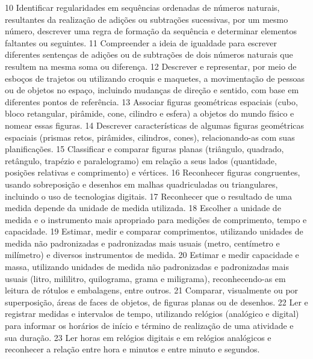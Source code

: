 {{{			}
			{10}{%
				Identificar regularidades em sequências ordenadas de números naturais,
				resultantes da realização de adições ou subtrações sucessivas, por um mesmo número,
				descrever uma regra de formação da sequência e determinar elementos faltantes ou seguintes.
			}
			{11}{%
				Compreender a ideia de igualdade para escrever diferentes sentenças de adições
				ou de subtrações de dois números naturais que resultem na mesma soma ou diferença.
			}
			{12}{%
				Descrever e representar, por meio de esboços de trajetos ou utilizando croquis
				e maquetes, a movimentação de pessoas ou de objetos no espaço, incluindo mudanças de
				direção e sentido, com base em diferentes pontos de referência.
			}
			{13}{%
				Associar figuras geométricas espaciais (cubo, bloco retangular, pirâmide, cone,
				cilindro e esfera) a objetos do mundo físico e nomear essas figuras.
			}
			{14}{%
				Descrever características de algumas figuras geométricas espaciais (prismas
				retos, pirâmides, cilindros, cones), relacionando-as com suas planificações.
			}
			{15}{%
				Classificar e comparar figuras planas (triângulo, quadrado, retângulo, trapézio
				e paralelogramo) em relação a seus lados (quantidade, posições relativas e comprimento) e
				vértices.
			}
			{16}{%
				Reconhecer figuras congruentes, usando sobreposição e desenhos em malhas
				quadriculadas ou triangulares, incluindo o uso de tecnologias digitais.
			}
			{17}{%
				Reconhecer que o resultado de uma medida depende da unidade de medida
				utilizada.
			}
			{18}{%
				Escolher a unidade de medida e o instrumento mais apropriado para medições de
				comprimento, tempo e capacidade.
			}
			{19}{%
				Estimar, medir e comparar comprimentos, utilizando unidades de medida
				não padronizadas e padronizadas mais usuais (metro, centímetro e milímetro) e diversos
				instrumentos de medida.
			}
			{20}{%
				Estimar e medir capacidade e massa, utilizando unidades de medida não
				padronizadas e padronizadas mais usuais (litro, mililitro, quilograma, grama e miligrama),
				reconhecendo-as em leitura de rótulos e embalagens, entre outros.
			}
			{21}{%
				Comparar, visualmente ou por superposição, áreas de faces de objetos, de figuras
				planas ou de desenhos.
			}
			{22}{%
				Ler e registrar medidas e intervalos de tempo, utilizando relógios (analógico e
				digital) para informar os horários de início e término de realização de uma atividade e sua
				duração.
			}
			{23}{%
				Ler horas em relógios digitais e em relógios analógicos e reconhecer a relação
				entre hora e minutos e entre minuto e segundos.
}}}
